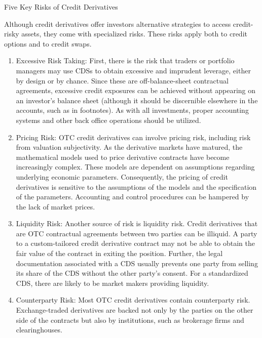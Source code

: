 \documentclass[11pt]{article}
\begin{document}
Five Key Risks of Credit Derivatives

Although credit derivatives offer investors alternative strategies to access credit-risky assets, they come with specialized risks. These risks apply both to credit options and to credit swaps.

\begin{enumerate}
  \item Excessive Risk Taking: First, there is the risk that traders or portfolio managers may use CDSs to obtain excessive and imprudent leverage, either by design or by chance. Since these are off-balance-sheet contractual agreements, excessive credit exposures can be achieved without appearing on an investor's balance sheet (although it should be discernible elsewhere in the accounts, such as in footnotes). As with all investments, proper accounting systems and other back office operations should be utilized.

  \item Pricing Risk: OTC credit derivatives can involve pricing risk, including risk from valuation subjectivity. As the derivative markets have matured, the mathematical models used to price derivative contracts have become increasingly complex. These models are dependent on assumptions regarding underlying economic parameters. Consequently, the pricing of credit derivatives is sensitive to the assumptions of the models and the specification of the parameters. Accounting and control procedures can be hampered by the lack of market prices.

  \item Liquidity Risk: Another source of risk is liquidity risk. Credit derivatives that are OTC contractual agreements between two parties can be illiquid. A party to a custom-tailored credit derivative contract may not be able to obtain the fair value of the contract in exiting the position. Further, the legal documentation associated with a CDS usually prevents one party from selling its share of the CDS without the other party's consent. For a standardized CDS, there are likely to be market makers providing liquidity.

  \item Counterparty Risk: Most OTC credit derivatives contain counterparty risk. Exchange-traded derivatives are backed not only by the parties on the other side of the contracts but also by institutions, such as brokerage firms and clearinghouses.

\end{enumerate}
\end{document}
